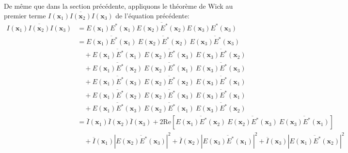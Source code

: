 De même que dans la section précédente, appliquons le théorème de Wick au premier terme $\overline{I(\mathbf{x}_1) I(\mathbf{x}_2) I(\mathbf{x}_3)}$ de l'équation précédente:
\begin{align}
\overline{I(\mathbf{x}_1)I(\mathbf{x}_2)I(\mathbf{x}_3)} &= \overline{E(\mathbf{x}_1)E^*(\mathbf{x}_1)E(\mathbf{x}_2)E^*(\mathbf{x}_2)E(\mathbf{x}_3)E^*(\mathbf{x}_3)} \\
&= \overline{E(\mathbf{x}_1)E^*(\mathbf{x}_1)}\:\overline{E(\mathbf{x}_2)E^*(\mathbf{x}_2)}\:\overline{E(\mathbf{x}_3)E^*(\mathbf{x}_3)} \\
\nonumber & \quad + \overline{E(\mathbf{x}_1)E^*(\mathbf{x}_1)}\:\overline{E(\mathbf{x}_2)E^*(\mathbf{x}_3)}\:\overline{E(\mathbf{x}_3)E^*(\mathbf{x}_2)} \\
\nonumber & \quad + \overline{E(\mathbf{x}_1)E^*(\mathbf{x}_2)}\:\overline{E(\mathbf{x}_2)E^*(\mathbf{x}_1)}\:\overline{E(\mathbf{x}_3)E^*(\mathbf{x}_3)} \\
\nonumber & \quad + \overline{E(\mathbf{x}_1)E^*(\mathbf{x}_3)}\:\overline{E(\mathbf{x}_2)E^*(\mathbf{x}_2)}\:\overline{E(\mathbf{x}_3)E^*(\mathbf{x}_1)} \\
\nonumber & \quad + \overline{E(\mathbf{x}_1)E^*(\mathbf{x}_2)}\:\overline{E(\mathbf{x}_2)E^*(\mathbf{x}_3)}\:\overline{E(\mathbf{x}_3)E^*(\mathbf{x}_1)} \\
\nonumber & \quad + \overline{E(\mathbf{x}_1)E^*(\mathbf{x}_3)}\:\overline{E(\mathbf{x}_2)E^*(\mathbf{x}_1)}\:\overline{E(\mathbf{x}_3)E^*(\mathbf{x}_2)} \\
\nonumber&= \overline{I}(\mathbf{x}_1) \overline{I}(\mathbf{x}_2) \overline{I}(\mathbf{x}_3) +2 \mathrm{Re}\left[ \overline{E(\mathbf{x}_1)E^*(\mathbf{x}_2)}\:\overline{E(\mathbf{x}_2)E^*(\mathbf{x}_3)}\:\overline{E(\mathbf{x}_3)E^*(\mathbf{x}_1)} \right] \\
& \quad + \overline{I}(\mathbf{x}_1) \left|\overline{E(\mathbf{x}_2)E^*(\mathbf{x}_3)}\right|^2 + \overline{I}(\mathbf{x}_2) \left|\overline{E(\mathbf{x}_3)E^*(\mathbf{x}_1)}\right|^2 + \overline{I}(\mathbf{x}_3) \left|\overline{E(\mathbf{x}_1)E^*(\mathbf{x}_2)}\right|^2
\end{align}

